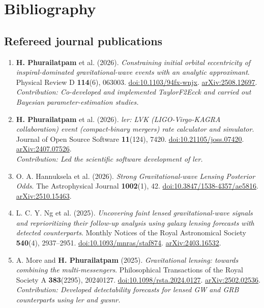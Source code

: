 \documentclass[11pt]{article}
\begin{document}
\newpage
\section*{Bibliography}
\subsection*{Refereed journal publications}
\begin{enumerate}
\item \textbf{H. Phurailatpam} et al. (2026). \textit{Constraining initial orbital eccentricity of inspiral-dominated gravitational-wave events with an analytic approximant}. Physical Review D \textbf{114}(6), 063003. \href{https://doi.org/10.1103/94fx-wnjx}{doi:10.1103/94fx-wnjx}. \href{https://arxiv.org/abs/2508.12697}{arXiv:2508.12697}.\\\emph{Contribution: Co-developed and implemented TaylorF2Ecck and carried out Bayesian parameter-estimation studies.}

\item \textbf{H. Phurailatpam} et al. (2026). \textit{ler: LVK (LIGO-Virgo-KAGRA collaboration) event (compact-binary mergers) rate calculator and simulator}. Journal of Open Source Software \textbf{11}(124), 7420. \href{https://doi.org/10.21105/joss.07420}{doi:10.21105/joss.07420}. \href{https://arxiv.org/abs/2407.07526}{arXiv:2407.07526}.\\\emph{Contribution: Led the scientific software development of ler.}

\item O. A. Hannuksela et al. (2026). \textit{Strong Gravitational-wave Lensing Posterior Odds}. The Astrophysical Journal \textbf{1002}(1), 42. \href{https://doi.org/10.3847/1538-4357/ae5816}{doi:10.3847/1538-4357/ae5816}. \href{https://arxiv.org/abs/2510.15463}{arXiv:2510.15463}.

\item L. C. Y. Ng et al. (2025). \textit{Uncovering faint lensed gravitational-wave signals and reprioritizing their follow-up analysis using galaxy lensing forecasts with detected counterparts}. Monthly Notices of the Royal Astronomical Society \textbf{540}(4), 2937--2951. \href{https://doi.org/10.1093/mnras/staf874}{doi:10.1093/mnras/staf874}. \href{https://arxiv.org/abs/2403.16532}{arXiv:2403.16532}.

\item A. More and \textbf{H. Phurailatpam} (2025). \textit{Gravitational lensing: towards combining the multi-messengers}. Philosophical Transactions of the Royal Society A \textbf{383}(2295), 20240127. \href{https://doi.org/10.1098/rsta.2024.0127}{doi:10.1098/rsta.2024.0127}. \href{https://arxiv.org/abs/2502.02536}{arXiv:2502.02536}.\\\emph{Contribution: Developed detectability forecasts for lensed GW and GRB counterparts using ler and gwsnr.}


\end{enumerate}
\end{document}
